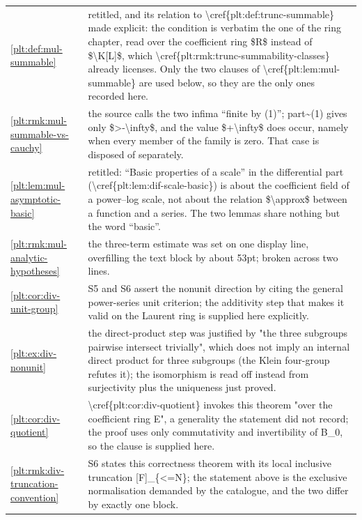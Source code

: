 \documentclass[11pt,oneside]{article}
\theoremstyle{plain}
\theoremstyle{definition}
\theoremstyle{remark}
\begin{document}
\begin{longtable}{@{}p{} p{}@{}}
\cref{plt:def:mul-summable} & retitled, and its relation to \textbackslash cref\{plt:def:trunc-summable\} made explicit: the condition is verbatim the one of the ring chapter, read over the coefficient ring \$R\$ instead of \$\textbackslash K[L]\$, which \textbackslash cref\{plt:rmk:trunc-summability-classes\} already licenses. Only the two clauses of \textbackslash cref\{plt:lem:mul-summable\} are used below, so they are the only ones recorded here.\\
\cref{plt:rmk:mul-summable-vs-cauchy} & the source calls the two infima ``finite by (1)''; part\textasciitilde (1) gives only \$>-\textbackslash infty\$, and the value \$+\textbackslash infty\$ does occur, namely when every member of the family is zero. That case is disposed of separately.\\
\cref{plt:lem:mul-asymptotic-basic} & retitled: ``Basic properties of a scale'' in the differential part (\textbackslash cref\{plt:lem:dif-scale-basic\}) is about the coefficient field of a power--log scale, not about the relation \$\textbackslash approx\$ between a function and a series. The two lemmas share nothing but the word ``basic''.\\
\cref{plt:rmk:mul-analytic-hypotheses} & the three-term estimate was set on one display line, overfilling the text block by about 53pt; broken across two lines.\\
\cref{plt:cor:div-unit-group} & S5 and S6 assert the nonunit direction by citing the general power-series unit criterion; the additivity step that makes it valid on the Laurent ring is supplied here explicitly.\\
\cref{plt:ex:div-nonunit} & the direct-product step was justified by "the three subgroups pairwise intersect trivially", which does not imply an internal direct product for three subgroups (the Klein four-group refutes it); the isomorphism is read off instead from surjectivity plus the uniqueness just proved.\\
\cref{plt:cor:div-quotient} & \textbackslash cref\{plt:cor:div-quotient\} invokes this theorem "over the coefficient ring E", a generality the statement did not record; the proof uses only commutativity and invertibility of B\_0, so the clause is supplied here.\\
\cref{plt:rmk:div-truncation-convention} & S6 states this correctness theorem with its local inclusive truncation [F]\_\{<=N\}; the statement above is the exclusive normalisation demanded by the catalogue, and the two differ by exactly one block.\\

\end{longtable}
\end{document}
